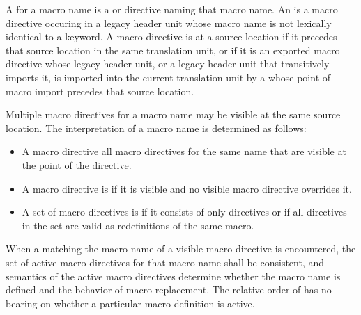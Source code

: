 \begin{after}
\begin{std.txt}
\noindent %
\color{addclr}
\alinea
A  for a macro name is a  or
 directive naming that macro name.
An  is
a macro directive occuring in a legacy header unit
whose macro name is not lexically identical to a keyword.
A macro directive is  at a source location
if it precedes that source location in the same translation unit, or
if it is an exported macro directive whose legacy header unit,
or a legacy header unit that transitively imports it,
is imported into the current translation unit by a 
whose point of macro import precedes that source location.

\alinea
Multiple macro directives for a macro name may be visible at the same
source location.
The interpretation of a macro name is determined as follows:
\begin{itemize}
\item
\color{addclr}
A macro directive  all macro directives for the same name
that are visible at the point of the directive.
\item
\color{addclr}
A macro directive is  if it is visible and
no visible macro directive overrides it.
\item
\color{addclr}
A set of macro directives is  if it consists of only
 directives or if all  directives in the set
are valid as redefinitions of the same macro.
\end{itemize}
\color{addclr}
When a  matching the macro name of a visible
macro directive is encountered, the set of active macro directives for that
macro name shall be consistent, and semantics of the active macro directives
determine whether the macro name is defined and the behavior of macro
replacement.
\enternote
The relative order of  has no bearing on whether a
particular macro definition is active.
\exitnote


\end{std.txt}
\end{after}
